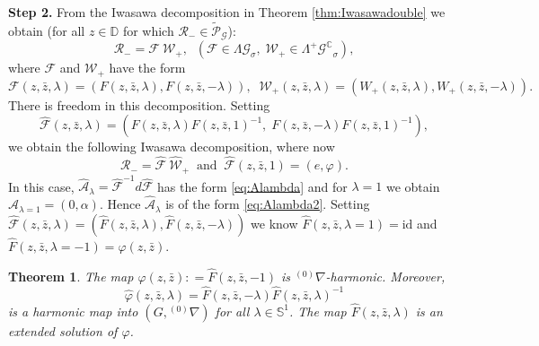 \documentclass[12pt]{amsart}
\newtheorem{Theorem}{Theorem}[section]
\theoremstyle{definition}
\theoremstyle{remark}
\numberwithin{equation}{section}
\begin{document}
 {\bfseries Step 2.} From the Iwasawa decomposition in Theorem 
 \ref{thm:Iwasawadouble} we obtain (for all $z \in {\mathbb D}$ for which ${\mathcal R}_{-} \in \tilde{\mathcal P}_{\mathcal G}$):
\begin{equation*}
 {\mathcal R}_{-} = {\mathcal F} \>{\mathcal W}_{+}, \;\;({\mathcal F} \in {\Lambda {\mathcal G}}_{\sigma}, \; {\mathcal W}_+ \in {\Lambda^{+} {\mathcal G}^{\mathbb C}}_{\sigma}),
\end{equation*}
 where ${\mathcal F}$ and ${\mathcal W}_+$ have the form
\begin{equation*}
 {\mathcal F}(z, \bar z,  {\lambda})= \left(F(z, \bar z, {\lambda}), F(z, \bar z, -{\lambda})\right), \;\;
 {\mathcal W}_+(z, \bar z,  {\lambda})= \left(W_+(z, \bar z, {\lambda}), W_+(z, \bar z, -{\lambda})
 \right).
\end{equation*} 
 There is freedom in this decomposition. 
 Setting 
\begin{equation*}
 \hat {\mathcal F}(z, \bar z, {\lambda}) = (F(z, \bar z, {\lambda}) F(z, \bar z, 1)^{-1}, \;
 F(z, \bar z, - {\lambda}) F(z, \bar z, 1)^{-1}),
\end{equation*}
 we obtain the following Iwasawa decomposition, where now 
\begin{equation*}
 {\mathcal R}_- = \hat {\mathcal F} \>\hat {\mathcal W}_+ \;\;\mbox{and} \;\;
 \hat {\mathcal F}(z, \bar z, 1)= (e, \varphi).
\end{equation*}
 In this case, $\hat {\mathcal A}_{\lambda} = \hat {\mathcal F}^{-1} d \hat {\mathcal F}$ has 
 the form \eqref{eq:Alambda} and  for ${\lambda} =1$ 
 we obtain $\hat {\mathcal A}_{{\lambda} =1} 
 = (0, \alpha)$. Hence $\hat {\mathcal A}_{\lambda}$ is of the form \eqref{eq:Alambda2}.
 Setting 
 $\hat {\mathcal F}(z, \bar z, {\lambda}) = (\hat F(z, \bar z, {\lambda}),  \hat F(z, \bar z,- {\lambda}))$ 
 we know $\hat F(z, \bar z, {\lambda}= 1) = \mathrm{id}$
 and $\hat F(z, \bar z, {\lambda} =-1) = \varphi(z, \bar z)$. 
\begin{Theorem}
 The map $\varphi (z, \bar z): = \hat F(z, \bar z, -1)$ 
 is ${{}^{(0)}\nabla}$-harmonic. Moreover, 
\begin{equation*}
 \hat \varphi(z, \bar z, {\lambda}) = \hat F(z, \bar z, -{\lambda}) 
 \hat F(z, \bar z, {\lambda} )^{-1}
\end{equation*}
 is a harmonic map into $(G, {{}^{(0)}\nabla})$ for all 
 $\lambda \in \mathbb S^1$. 
 The map $\hat{F}(z,\bar{z},{\lambda})$ is an extended solution of $\varphi$.
\end{Theorem}
\end{document}
